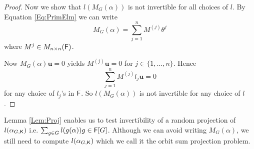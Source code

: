 \begin{proof}
 
 Now we show that $l(M_G(\alpha))$ is not invertible for all
 choices of $l$. By Equation \ref{Eq:PrimElm} we can write 
 $$M_G(\alpha) = \sum_{j = 1}^n M^{(j)} \theta^j$$ 
 where $M^{j} \in M_{n \times n}({\mathsf{F}})$. 
 
 Now $M_G(\alpha) \textbf{u} =0$ yields $M^{(j)}\textbf{u} = 0$ for $j \in \lbrace 1, \ldots , n \rbrace$. Hence
 $$\sum_{j = 1}^n M^{(j)} l_j \textbf{u} = 0$$ for any choice of $l_j$'s in ${\mathsf{F}}$. So $l(M_G(\alpha))$ is not invertible for any choice of $l$.
\end{proof} 
Lemma \ref{Lem:Proj} enables us to test invertibility of a random projection of $l(\alpha_{G,{\mathsf{K}}}) $ i.e. $\sum_{g \in G}
 l(g(\alpha))g \in {\mathsf{F}}[G]$. Although we can avoid writing $M_G(\alpha)$, we still need to compute $l(\alpha_{G,{\mathsf{K}}})$ which
 we call it the orbit sum projection problem.

